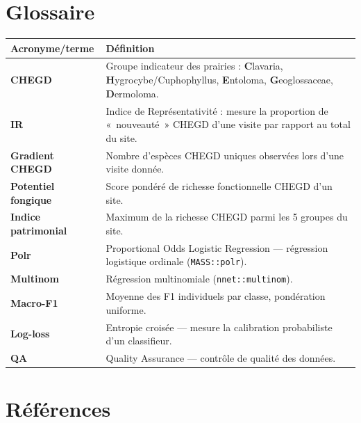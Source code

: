 \documentclass[11pt,a4paper]{article}
\begin{document}
\section*{Glossaire}

\begin{table}[htbp]
  \centering
  \begin{tabularx}{\textwidth}{lX}
    \toprule
    \textbf{Acronyme/terme} & \textbf{Définition} \\
    \midrule
    \textbf{CHEGD} & Groupe indicateur des prairies : \textbf{C}lavaria, \textbf{H}ygrocybe/Cuphophyllus, \textbf{E}ntoloma, \textbf{G}eoglossaceae, \textbf{D}ermoloma. \\
    \textbf{IR}    & Indice de Représentativité : mesure la proportion de «~nouveauté~» CHEGD d'une visite par rapport au total du site. \\
    \textbf{Gradient CHEGD} & Nombre d'espèces CHEGD uniques observées lors d'une visite donnée. \\
    \textbf{Potentiel fongique} & Score pondéré de richesse fonctionnelle CHEGD d'un site. \\
    \textbf{Indice patrimonial} & Maximum de la richesse CHEGD parmi les 5 groupes du site. \\
    \textbf{Polr}  & Proportional Odds Logistic Regression — régression logistique ordinale (\texttt{MASS::polr}). \\
    \textbf{Multinom} & Régression multinomiale (\texttt{nnet::multinom}). \\
    \textbf{Macro-F1} & Moyenne des F1 individuels par classe, pondération uniforme. \\
    \textbf{Log-loss} & Entropie croisée — mesure la calibration probabiliste d'un classifieur. \\
    \textbf{QA}    & Quality Assurance — contrôle de qualité des données. \\
    \bottomrule
  \end{tabularx}
\end{table}

\section*{Références}
\end{document}
